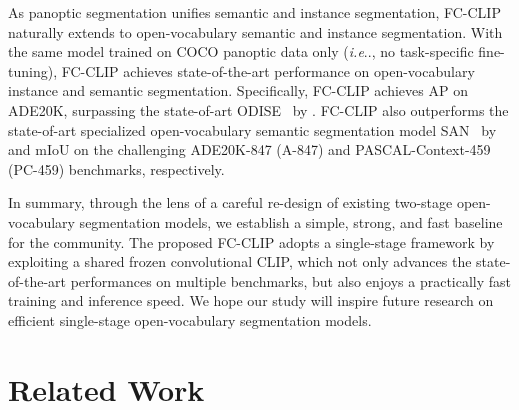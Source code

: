 \documentclass{article}
\makeatletter
\DeclareRobustCommand\onedot{\futurelet\@let@token\@onedot}
\def\@onedot{\ifx\@let@token.\else.\null\fi\xspace}
\def\ie{\emph{i.e}\onedot}
\newcommand{\modelname}{FC-CLIP\xspace}
\makeatother
\begin{document}
As panoptic segmentation unifies semantic and instance segmentation, \modelname naturally extends to open-vocabulary semantic and instance segmentation.
With the same model trained on COCO panoptic data only (\ie, no task-specific fine-tuning), \modelname achieves state-of-the-art performance on open-vocabulary instance and semantic segmentation.
Specifically, \modelname achieves  AP on ADE20K, surpassing the state-of-art ODISE~\cite{xu2023open} by .
\modelname also outperforms the state-of-art specialized open-vocabulary semantic segmentation model SAN~\cite{xu2023side} by  and  mIoU on the challenging ADE20K-847 (A-847) and PASCAL-Context-459 (PC-459) benchmarks, respectively.


In summary, through the lens of a careful re-design of existing two-stage open-vocabulary segmentation models, we establish a simple, strong, and fast baseline for the community.
The proposed \modelname adopts a single-stage framework by exploiting a shared frozen convolutional CLIP, which not only advances the state-of-the-art performances on multiple benchmarks, but also enjoys a practically fast training and inference speed.
We hope our study will inspire future research on efficient single-stage open-vocabulary segmentation models. \section{Related Work}
\label{RelatedWork}
\end{document}
